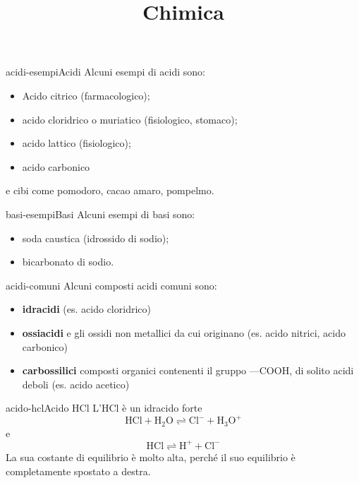 \documentclass[preview]{standalone}
\begin{document}
\title{Chimica}
\genpage

\begin{snippetexample}{acidi-esempi}{Acidi}
    Alcuni esempi di acidi sono:
    \begin{itemize}
        \item Acido citrico (farmacologico);
        \item acido cloridrico o muriatico (fisiologico, stomaco);
        \item acido lattico (fisiologico);
        \item acido carbonico
    \end{itemize}
    e cibi come pomodoro, cacao amaro, pompelmo.
\end{snippetexample}

\begin{snippetexample}{basi-esempi}{Basi}
    Alcuni esempi di basi sono:
    \begin{itemize}
        \item soda caustica (idrossido di sodio);
        \item bicarbonato di sodio.
    \end{itemize}
\end{snippetexample}


\begin{snippet}{acidi-comuni}
    Alcuni composti acidi comuni sono:
    \begin{itemize}
        \item \textbf{idracidi} (es. acido cloridrico)
        \item \textbf{ossiacidi} e gli ossidi non metallici da cui originano (es. acido nitrici, acido carbonico)
        \item \textbf{carbossilici} composti organici contenenti il gruppo —COOH,
            di solito acidi deboli (es. acido acetico)
    \end{itemize}
\end{snippet}

\begin{snippetexample}{acido-hcl}{Acido HCl}
    L'HCl è un idracido forte
    \[
        \text{HCl} + \text{H}_2\text{O} \rightleftharpoons \text{Cl}^- + \text{H}_3\text{O}^+
    \]
    e
    \[
        \text{HCl} \rightleftharpoons \text{H}^+ + \text{Cl}^-
    \]
    La sua costante di equilibrio è molto alta, perché il suo equilibrio è completamente spostato a destra.
\end{snippetexample}
\end{document}

